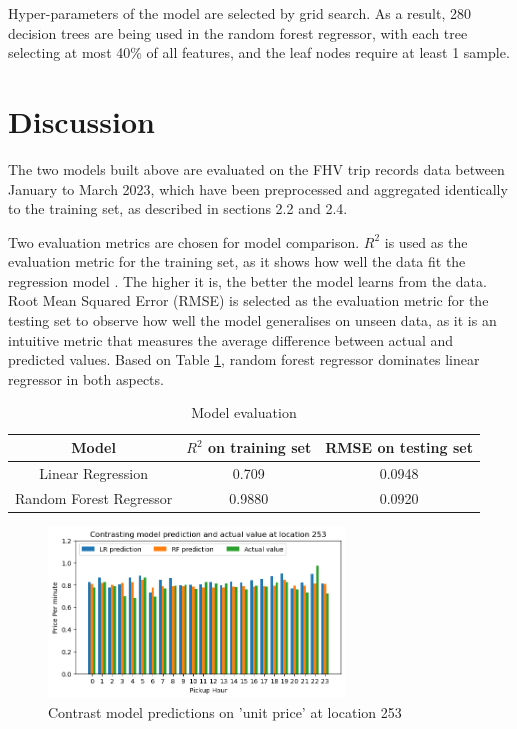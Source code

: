\documentclass[11pt]{article}
\begin{document}
Hyper-parameters of the model are selected by grid search. As a result, 280 decision trees are being used in the random forest regressor, with each tree selecting at most 40\% of all features, and the leaf nodes require at least 1 sample. 

\section{Discussion}
The two models built above are evaluated on the FHV trip records data between January to March 2023, which have been preprocessed and aggregated identically to the training set, as described in sections 2.2 and 2.4.

Two evaluation metrics are chosen for model comparison. $R^2$ is used as the evaluation metric for the training set, as it shows how well the data fit the regression model \cite{R_sq}. The higher it is, the better the model learns from the data. Root Mean Squared Error (RMSE) is selected as the evaluation metric for the testing set to observe how well the model generalises on unseen data, as it is an intuitive metric that measures the average difference between actual and predicted values. Based on Table \ref{Model_evaluation}, random forest regressor dominates linear regressor in both aspects.

\begin{table}[h!]
\centering
    \begin{tabular} {|c||c|c|}
    \hline
    \textbf{Model} & \textbf{$R^2$ on training set} & \textbf{RMSE on testing set} \\
    \hline
    Linear Regression & 0.709 & 0.0948 \\ 
    \hline
    Random Forest Regressor & 0.9880 & 0.0920 \\
    \hline
    \end{tabular}
    \caption{Model evaluation}
    \label{Model_evaluation}
\end{table}

\begin{figure}[h]
    \includegraphics[width=0.7\textwidth]{plots/Pred_contrast_253.png}
    \centering
    \caption{Contrast model predictions on 'unit price' at location 253} 
    \label{contrast_pred}
\end{figure}
\end{document}
